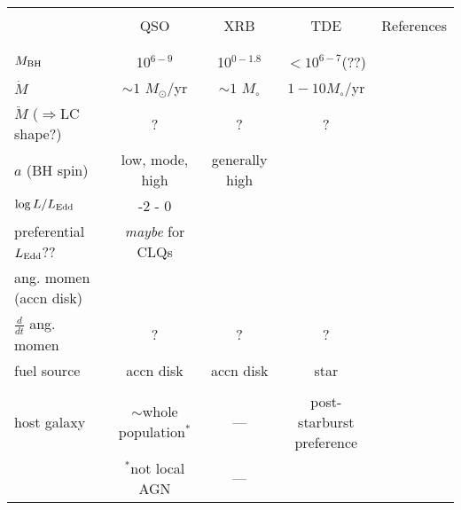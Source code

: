 \documentclass[11pt]{article}
\begin{document}
\clearpage
\LARGE
\begin{table}
    \begin{center}
      \begin{tabular}{l ccc c } 
        \hline
        \hline 
                                            & & & & \\
                                               & QSO                                & XRB                                  & TDE                & References \\
                                            & & & \\
        \hline 
                                            & & & \\
$M_{\rm BH}$                            & 10$^{6-9}$                       &  10$^{0-1.8}$                    &  $<10^{6-7}$(??)           \\ 
$\dot{M}$                               &  $\sim1$ $M_{\odot}$/yr      &    $\sim1$ $M_{\circ}$       & $1-10 M_{\circ}$/yr   \\
$\ddot{M}$ ($\Rightarrow$LC shape?)          &  ?                                    &    ?                                    & ? \\
$a$ (BH spin)                         & low, mode, high              & generally high                  &  \\
$\log L/ L_{\rm Edd}$                    & -2 - 0                             & & \\
preferential $L_{\rm Edd}$??       & {\it maybe} for CLQs              & & \\
ang. momen (accn disk)                   &                                       &                                   & \\           
$\frac{d}{dt}$ ang. momen      &    ?                                   &      ?                             & ? \\           
fuel source                              & accn disk & accn disk & star \\ 
                                            & & & \\
host galaxy                         & $\sim$whole population$^{*}$   & ---  & post-starburst preference \\  
                                          & $^{*}$not local AGN   & ---  & \\  

\end{tabular}
\end{center}
\end{table}
\end{document}
